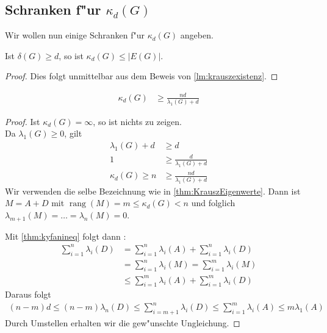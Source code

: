 \subsection{Schranken f"ur $\kappa_d(G)$}

Wir wollen nun einige Schranken f"ur $\kappa_{d}(G)$ angeben. 
\begin{lemma}
  Ist $\delta(G) \geq d$, so ist $\kappa_{d}(G) \leq |E(G)|$. 
\end{lemma}
\begin{proof}
  Dies folgt unmittelbar aus dem Beweis von \ref{lm:krauszexistenz}. 
\end{proof}

\begin{theorem}
  \begin{align*}
    \kappa_{d}(G) &\geq \frac{nd}{\lambda_{1}(G) +d} 
  \end{align*}
  \label{thm:kappaineq1}
\end{theorem}

\begin{proof}
  Ist $\kappa_{d}(G) = \infty$, so ist nichts zu zeigen. \\
   Da $\lambda_{1}(G) \geq 0$, gilt 
  \begin{align*}
    \lambda_{1}(G) + d &\geq d \\
    1 &\geq \frac{d}{\lambda_{1}(G) + d }\\
    \kappa_{d}(G) \geq n &\geq \frac{nd}{\lambda_{1}(G)+d}
  \end{align*}
  Wir verwenden die selbe Bezeichnung wie in \ref{thm:KrauszEigenwerte}. Dann ist $M=A+D$ mit $\operatorname{rang} (M) = m \leq \kappa_{d}(G) < n$ und folglich $\lambda_{m+1}(M) = \dots = \lambda_{n}(M) = 0$. 

  Mit \ref{thm:kyfanineq} folgt dann : 
  \begin{align*}
    \sum\limits_{i=1}^{n} \lambda_{i}(D) &=\sum\limits_{i=1}^{n} \lambda_{i}(A) +\sum\limits_{i=1}^{n}  \lambda_{i}(D) \\
    &=\sum\limits_{i=1}^{n} \lambda_{i}(M) =\sum\limits_{i=1}^{m} \lambda_{i}(M) \\
    &\leq \sum\limits_{i=1}^{m} \lambda_{i}(A) +\sum\limits_{i=1}^{m} \lambda_{i}(D)
  \end{align*}
  Daraus folgt 
  \begin{align*}
    (n-m) d \leq (n-m) \lambda_n(D) \leq \sum\limits_{i=m+1}^{n} \lambda_{i}(D) \leq\sum\limits_{i=1}^{m} \lambda_{i}(A) \leq m\lambda_{1}(A)
  \end{align*}
  Durch Umstellen erhalten wir die gew"unschte Ungleichung.
\end{proof}

